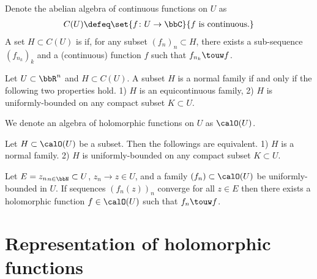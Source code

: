 \documentclass[openany, a4paper, oneside]{jsbook}
\begin{document}
\begin{defn}
 Denote the abelian algebra of continuous functions on $U$ as
 \begin{align}
  C (U)
  \defeq
  \set{f \colon U \to \bbC}{f \text{ is continuous.}}
 \end{align}
 A set $H \subset C (U)$ is  if, for any subset $(f_n)_n \subset H$, there exists a sub-sequence $(f_{n_k})_k$
 and a (continuous) function $f$ such that $f_{n_k} \touw f$.
\end{defn}
\begin{thm}
 Let $U \subset \bbR^n$ and $H \subset C (U)$.
 A subset $H$ is a normal family if and only if the following two properties hold.
 1) $H$ is an equicontinuous family,
 2) $H$ is uniformly-bounded on any compact subset $K \subset U$.
\end{thm}
We denote an algebra of holomorphic functions on $U$ as $\calO (U)$.
\begin{thm}[Montel]
 Let $H \subset \calO (U)$ be a subset.
 Then the followings are equivalent.
 1) $H$ is a normal family.
 2) $H$ is uniformly-bounded on any compact subset $K \subset U$.
\end{thm}
\begin{thm}
 Let $E = {z_n}_{n \in \bbN} \subset U$, $z_n \to z \in U$, and a family $(f_n) \subset \calO (U)$ be uniformly-bounded in $U$.
 If sequences $(f_n (z))_n$ converge for all $z \in E$ then there exists a holomorphic function $f \in \calO (U)$ such that $f_n \touw f$.
\end{thm}
\section{Representation of holomorphic functions}
\end{document}
